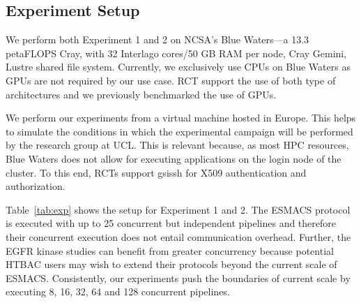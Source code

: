 \subsection{Experiment Setup}\label{ssec:exp_setup}

We perform both Experiment 1 and 2 on NCSA's Blue Waters---a 13.3 petaFLOPS
Cray, with 32 Interlago cores/50 GB RAM per node, Cray Gemini, Lustre shared
file system. Currently, we exclusively use CPUs on Blue Waters as GPUs are
not required by our use case. RCT support the use of both type of
architectures and we previously benchmarked the use of GPUs.

We perform our experiments from a virtual machine hosted in Europe. This
helps to simulate the conditions in which the experimental campaign will be
performed by the research group at UCL\@. This is relevant because, as most
HPC resources, Blue Waters does not allow for executing applications on the
login node of the cluster. To this end, RCTs support \textmd{gsissh} for X509
authentication and authorization.

Table~\ref{tab:exp} shows the setup for Experiment 1 and 2. The ESMACS
protocol is executed with up to 25 concurrent but independent pipelines and
therefore their concurrent execution does not entail communication overhead.
Further, the EGFR kinase studies can benefit from greater concurrency because
potential HTBAC users may wish to extend their protocols beyond the current
scale of ESMACS\@. Consistently, our experiments push the boundaries of
current scale by executing 8, 16, 32, 64 and 128 concurrent pipelines.

